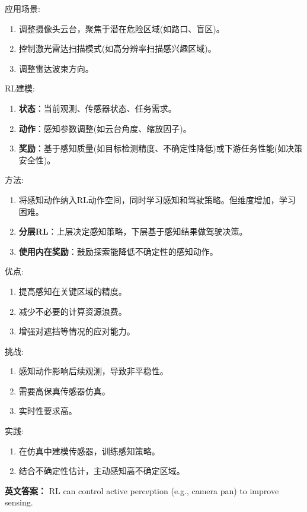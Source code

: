 \documentclass[10pt,a4paper]{ctexart}
\begin{document}
 应用场景:
\begin{enumerate}
    \item 调整摄像头云台，聚焦于潜在危险区域(如路口、盲区)。
    \item 控制激光雷达扫描模式(如高分辨率扫描感兴趣区域)。
    \item 调整雷达波束方向。
\end{enumerate}

 RL建模:
\begin{enumerate}
    \item \textbf{状态}：当前观测、传感器状态、任务需求。
    \item \textbf{动作}：感知参数调整(如云台角度、缩放因子)。
    \item \textbf{奖励}：基于感知质量(如目标检测精度、不确定性降低)或下游任务性能(如决策安全性)。
\end{enumerate}

 方法:
\begin{enumerate}
    \item 将感知动作纳入RL动作空间，同时学习感知和驾驶策略。但维度增加，学习困难。
    \item \textbf{分层RL}：上层决定感知策略，下层基于感知结果做驾驶决策。
    \item \textbf{使用内在奖励}：鼓励探索能降低不确定性的感知动作。
\end{enumerate}

 优点:
\begin{enumerate}
    \item 提高感知在关键区域的精度。
    \item 减少不必要的计算资源浪费。
    \item 增强对遮挡等情况的应对能力。
\end{enumerate}

 挑战:
\begin{enumerate}
    \item 感知动作影响后续观测，导致非平稳性。
    \item 需要高保真传感器仿真。
    \item 实时性要求高。
\end{enumerate}

 实践:
\begin{enumerate}
    \item 在仿真中建模传感器，训练感知策略。
    \item 结合不确定性估计，主动感知高不确定区域。
\end{enumerate}

\textbf{英文答案：}  
RL can control active perception (e.g., camera pan) to improve sensing.
\end{document}
